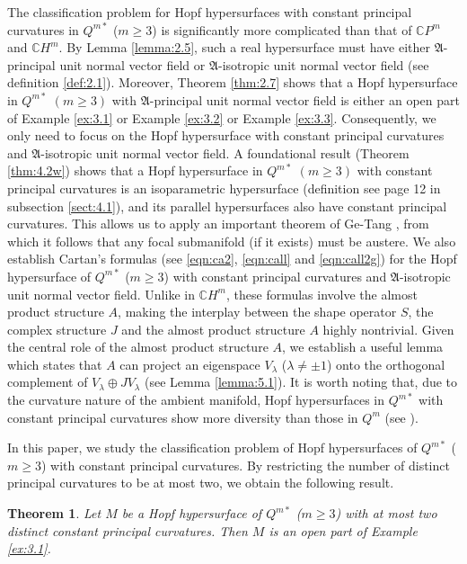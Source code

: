 \documentclass[reqno]{amsart}%
\newtheorem{theorem}{Theorem}[section]   %
\theoremstyle{definition}
\numberwithin{equation}{section}
\begin{document}
The classification problem for Hopf hypersurfaces with constant principal curvatures in $Q^{m*}$ ($m\geq3$) is significantly more complicated than that of $\mathbb{C}P^m$ and $\mathbb{C}H^m$. By Lemma \ref{lemma:2.5}, such a real hypersurface must have either $\mathfrak{A}$-principal unit normal vector field or $\mathfrak{A}$-isotropic unit normal vector field
(see definition \ref{def:2.1}). Moreover, Theorem \ref{thm:2.7} shows that a Hopf hypersurface in $Q^{m*}$ $(m\ge3)$ with $\mathfrak{A}$-principal unit normal vector field is either an open part of Example \ref{ex:3.1} or Example \ref{ex:3.2} or Example \ref{ex:3.3}. Consequently, we only need to focus on the Hopf hypersurface with constant principal curvatures and $\mathfrak{A}$-isotropic unit normal vector field. 
A foundational result (Theorem \ref{thm:4.2w}) shows that a Hopf hypersurface in $Q^{m*}$ $(m\ge3)$ with constant principal curvatures is an
isoparametric hypersurface (definition see page 12 in subsection \ref{sect:4.1}), and its parallel hypersurfaces also have constant principal curvatures. This allows us to apply an important theorem of Ge-Tang \cite{GT}, from which it follows that any focal submanifold (if it exists) must be austere.
We also establish Cartan's formulas (see \eqref{eqn:ca2}, \eqref{eqn:call} and \eqref{eqn:call2g}) for the Hopf hypersurface of $Q^{m*}$ ($m\geq3$) with constant principal curvatures and $\mathfrak{A}$-isotropic unit normal vector field. 
Unlike in $\mathbb{C}H^m$, these formulas involve the almost product structure $A$, making the interplay between the shape operator $S$, the complex structure $J$ and the almost product structure $A$ highly nontrivial. 
Given the central role of the almost product structure $A$, 
we establish a useful lemma which states that $A$ can project an eigenspace $V_{\lambda}$ ($\lambda\neq\pm1$) onto the orthogonal complement of $V_{\lambda}\oplus JV_{\lambda}$ (see Lemma \ref{lemma:5.1}). It is worth noting that, due to the curvature nature of the ambient manifold, Hopf hypersurfaces in $Q^{m*}$ with constant principal curvatures show more diversity than those in $Q^m$ (see \cite{LTY}).



In this paper, we study the classification problem of Hopf hypersurfaces of $Q^{m*}$ ($m\geq3$) with constant principal curvatures. By restricting the number of distinct principal curvatures to be at most two, we obtain the following result.
%
\begin{theorem}\label{thm:1.1a}
Let $M$ be a Hopf hypersurface of $Q^{m*}$ ($m\geq3$) with at most two distinct constant principal curvatures. Then $M$ is an open part of Example \ref{ex:3.1}.
\end{theorem}
\end{document}
